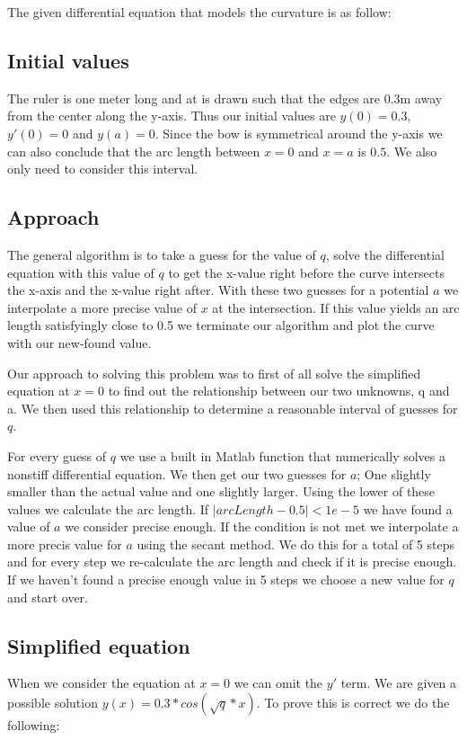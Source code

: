 The given differential equation that models the curvature is as follow:

\begin{center}
    
\end{center}

\subsection{Initial values}
The ruler is one meter long and at is drawn such that the edges are 0.3m away from the center along the y-axis. Thus our initial values are $y(0)=0.3$, $y'(0)=0$ and $y(a)=0$. Since the bow is symmetrical around the y-axis we can also conclude that the arc length between $x=0$ and $x=a$ is $0.5$. We also only need to consider this interval. 

\subsection{Approach}
The general algorithm is to take a guess for the value of $q$, solve the differential equation with this value of $q$ to get the x-value right before the curve intersects the x-axis and the x-value right after. With these two guesses for a potential $a$ we interpolate a more precise value of $x$ at the intersection. If this value yields an arc length satisfyingly close to 0.5 we terminate our algorithm and plot the curve with our new-found value.

Our approach to solving this problem was to first of all solve the simplified equation at $x=0$ to find out the relationship between our two unknowns, q and a. We then used this relationship to determine a reasonable interval of guesses for $q$.

For every guess of $q$ we use a built in Matlab function that numerically solves a nonstiff differential equation. We then get our two guesses for $a$; One slightly smaller than the actual value and one slightly larger. Using the lower of these values we calculate the arc length. If $|arcLength-0.5| < 1e-5$ we have found a value of $a$ we consider precise enough. If the condition is not met we interpolate a more precis value for $a$ using the secant method. We do this for a total of 5 steps and for every step we re-calculate the arc length and check if it is precise enough. If we haven't found a precise enough value in 5 steps we choose a new value for $q$ and start over.

\subsection{Simplified equation}
When we consider the equation at $x=0$ we can omit the $y'$ term. We are given a possible solution $y(x)=0.3*cos(\sqrt{q}*x)$. To prove this is correct we do the following:

